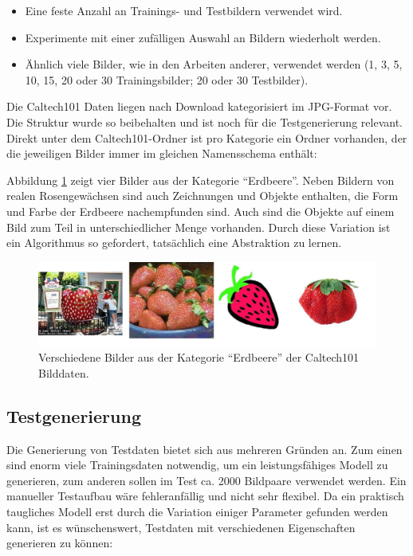 \begin{itemize}
	\item Eine feste Anzahl an Trainings- und Testbildern verwendet wird.
	\item Experimente mit einer zufälligen Auswahl an Bildern wiederholt werden.
	\item Ähnlich viele Bilder, wie in den Arbeiten anderer, verwendet werden (1, 3, 5, 10, 15, 20 oder 30 Trainingsbilder; 20 oder 30 Testbilder).
\end{itemize}

Die Caltech101 Daten liegen nach Download kategorisiert im JPG-Format vor. Die Struktur wurde so beibehalten und ist noch für die Testgenerierung relevant. Direkt unter dem Caltech101-Ordner ist pro Kategorie ein Ordner vorhanden, der die jeweiligen Bilder immer im gleichen Namensschema enthält:\newline


Abbildung \ref{img:strawberries} zeigt vier Bilder aus der Kategorie \enquote{Erdbeere}. Neben Bildern von realen Rosengewächsen sind auch Zeichnungen und Objekte enthalten, die Form und Farbe der Erdbeere nachempfunden sind. Auch sind die Objekte auf einem Bild zum Teil in unterschiedlicher Menge vorhanden. Durch diese Variation ist ein Algorithmus so gefordert, tatsächlich eine Abstraktion zu lernen.

\begin{figure}
	\centering
	\includegraphics[scale=0.5]{images/strawberry.png}
	\caption{Verschiedene Bilder aus der Kategorie \enquote{Erdbeere} der Caltech101 Bilddaten.}
	\label{img:strawberries}
\end{figure}

\subsection{Testgenerierung}

Die Generierung von Testdaten bietet sich aus mehreren Gründen an. Zum einen sind enorm viele Trainingsdaten notwendig, um ein leistungsfähiges Modell zu generieren, zum anderen sollen im Test ca. 2000 Bildpaare verwendet werden. Ein manueller Testaufbau wäre fehleranfällig und nicht sehr flexibel. Da ein praktisch taugliches Modell erst durch die Variation einiger Parameter gefunden werden kann, ist es wünschenswert, Testdaten mit verschiedenen Eigenschaften generieren zu können:

